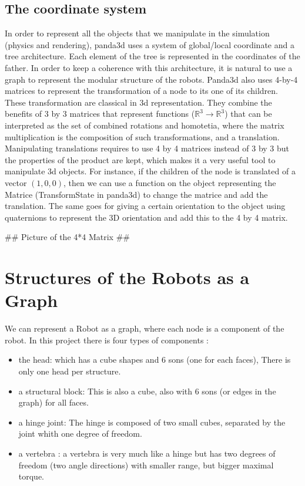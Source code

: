 \subsection{The coordinate system}
In order to represent all the objects that we manipulate in the simulation (physics and rendering), panda3d uses a system of global/local coordinate and a tree architecture. Each element of the tree is represented in the coordinates of the father. In order to keep a coherence with this architecture, it is natural to use a graph to represent the modular structure of the robots. Panda3d also uses 4-by-4 matrices to represent the transformation of a node to its one of its children. These transformation are classical in 3d representation. They combine the benefits of 3 by 3 matrices that represent functions ($\mathbb{R}^3 \to \mathbb{R}^3$) that can be interpreted as the set of combined rotations and homotetia, where the matrix multiplication is the composition of such transformations, and a translation. Manipulating translations requires to use 4 by 4 matrices instead of 3 by 3 but the properties of the product are kept, which makes it a very useful tool to manipulate 3d objects. For instance, if the children of the node is translated of a vector $(1, 0, 0)$, then we can use a function on the object representing the Matrice (TransformState in panda3d) to change the matrice and add the translation. The same goes for giving a certain orientation to the object using quaternions to represent the 3D orientation and add this to the 4 by 4 matrix.

## Picture of the 4*4 Matrix ##

\section{Structures of the Robots as a Graph} 

We can represent a Robot as a graph, where each node is a component of the robot. In this project there is four types of components : 
\begin{itemize}
    \item the head: which has a cube shapes and 6 sons (one for each faces), There is only one head per structure.
    \item a structural block: This is also a cube, also with 6 sons (or edges in the graph) for all faces.
    \item a hinge joint: The hinge is composed of two small cubes, separated by the joint whith one degree of freedom.
    \item a vertebra : a vertebra is very much like a hinge but has two degrees of freedom (two angle directions) with smaller range, but bigger maximal torque.
\end{itemize}

